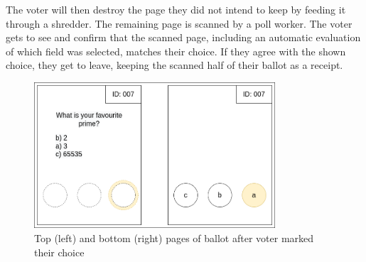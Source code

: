 The voter will then destroy the page they did not intend to keep by feeding it
through a shredder. The remaining page is scanned by a poll worker. The voter
gets to see and confirm that the scanned page, including an automatic
evaluation of which field was selected, matches their choice. If they agree
with the shown choice, they get to leave, keeping the scanned half of their
ballot as a receipt.

\begin{figure}
\centering
\includegraphics[width=0.8\textwidth]{../resources/high_level_ballot_voted_split.drawio}
\caption{Top (left) and bottom (right) pages of ballot after voter marked their choice}
\label{fig:punchscan_ballot_voted}
\end{figure}
